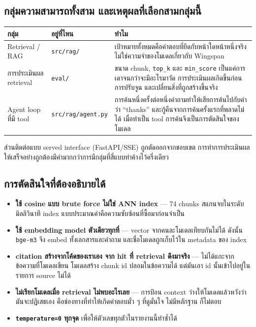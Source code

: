 \documentclass[11pt,a4paper]{article}
\newcommand{\thead}[1]{\textbf{#1}}
\newcommand{\code}[1]{\texttt{\small #1}}
\begin{document}
\subsection{กลุ่มความสามารถทั้งสาม และเหตุผลที่เลือกสามกลุ่มนี้}

\begin{table}[H]
\centering
\small
\begin{tabular}{@{}L{3.3cm} L{3.0cm} L{8.2cm}@{}}
\toprule
\thead{กลุ่ม} & \thead{อยู่ที่ไหน} & \thead{ทำไม} \\
\midrule
Retrieval / RAG & \code{src/rag/} &
เป้าหมายทั้งหมดคือคำตอบที่ยึดกับหน้าใดหน้าหนึ่งจริง ไม่ใช่ความจำของโมเดลเกี่ยวกับ Wingspan \\
การประเมินผล retrieval & \code{eval/} &
ขนาด chunk, \code{top\_k} และ \code{min\_score} เป็นแค่การเดาจนกว่าจะมีอะไรมาวัด
การประเมินผลเกิดขึ้นก่อนการปรับจูน และเปลี่ยนสิ่งที่ถูกสร้างขึ้นจริง \\
Agent loop ที่มี tool & \code{src/rag/agent.py} &
การค้นหนึ่งครั้งต่อหนึ่งคำถามทำให้เสียการค้นไปกับคำว่า “thanks”
และกู้คืนจากการค้นครั้งแรกที่พลาดไม่ได้ เมื่อทำเป็น tool การค้นจึงเป็นการตัดสินใจของโมเดล \\
\bottomrule
\end{tabular}
\end{table}

ส่วนติดต่อแบบ served interface (FastAPI/SSE) ถูกตัดออกจากขอบเขต
การทำการประเมินผลให้เสร็จอย่างถูกต้องมีค่ามากกว่าการมีกลุ่มที่สี่แบบทำค้างไว้ครึ่งเดียว

\subsection{การตัดสินใจที่ต้องอธิบายได้}

\begin{itemize}
  \item \textbf{ใช้ cosine แบบ brute force ไม่ใช่ ANN index} --- 74 chunks
        สแกนจบในระดับมิลลิวินาที index แบบประมาณค่าคือความซับซ้อนที่ซื้อมาก่อนจำเป็น
  \item \textbf{ใช้ embedding model ตัวเดียวทุกที่} --- vector จากคนละโมเดลเทียบกันไม่ได้
        ดังนั้น \code{bge-m3} จึง embed ทั้งเอกสารและคำถาม และชื่อโมเดลถูกเก็บไว้ใน
        metadata ของ index
  \item \textbf{citation สร้างจากโค้ดของเราเอง จาก hit ที่ retrieval ดึงมาจริง} ---
        ไม่ได้แกะจากข้อความที่โมเดลเขียน โมเดลสร้าง chunk id ปลอมในข้อความได้
        แต่มันเอา id นั้นเข้าไปอยู่ในรายการ source ไม่ได้
  \item \textbf{ไม่เรียกโมเดลเมื่อ retrieval ไม่พบอะไรเลย} ---
        การป้อน context ว่างให้โมเดลแล้วหวังว่ามันจะปฏิเสธเอง
        คือช่องทางที่ทำให้เกิดคำตอบมั่ว ๆ ที่ดูมั่นใจ ไม่มีหลักฐาน ก็ไม่ตอบ
  \item \textbf{\code{temperature=0} ทุกจุด} เพื่อให้ตัวเลขทุกตัวในรายงานนี้ทำซ้ำได้
\end{itemize}
\end{document}
